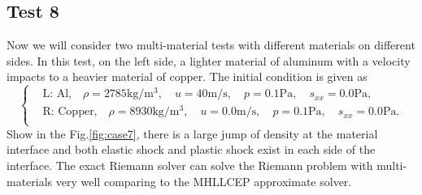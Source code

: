 \documentclass{article}
\numberwithin{equation}{section}
\numberwithin{table}{section}
\begin{document}
\subsection{Test 8}
Now we will consider two multi-material tests with different materials on different sides. In this test, on the left side, a lighter material of aluminum with a velocity impacts to a heavier material of copper. The initial condition is given as
\begin{equation}
 \left\{ \begin{aligned}
	 &	 \text{L: Al,}\quad  \rho = 2785 \text{kg}/\text{m}^3, \quad  u = 40\text{m}/\text{s}, \quad  p = 0.1\text{Pa}, \quad  s_{xx}=0.0\text{Pa},\\
	 &	 \text{R: Copper,}\quad  \rho = 8930\text{kg}/\text{m}^3, \quad  u = 0.0\text{m}/\text{s}, \quad  p =0.1\text{Pa}, \quad  s_{xx}=0.0\text{Pa}.\\
   \end{aligned}
 \right.
\end{equation}
Show in the Fig.\ref{fig:case7}, there is a large jump of density at the material interface and  both elastic shock and plastic shock exist in each side of the interface. The exact Riemann solver can solve the Riemann problem with multi-materials very well comparing to the MHLLCEP approximate solver.
\end{document}
